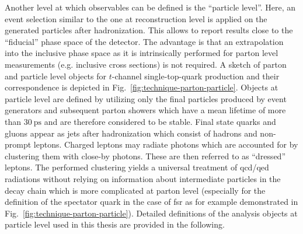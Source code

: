 
Another level at which observables can be defined is the ``particle level''. Here, an event selection similar to the one at reconstruction level is applied on the generated particles after hadronization. This allows to report results close to the ``fiducial'' phase space of the detector. The advantage is that an extrapolation into the inclusive phase space as it is intrinsically performed for parton level measurements (e.g. inclusive cross sections) is not required. A sketch of parton and particle level objects for $t$-channel single-top-quark production and their correspondence is depicted in Fig.~\ref{fig:technique-parton-particle}. Objects at particle level are defined by utilizing only the final particles produced by event generators and subsequent parton showers which have a mean lifetime of more than $30~\mathrm{ps}$ and are therefore considered to be stable. Final state quarks and gluons appear as jets after hadronization which consist of hadrons and non-prompt leptons. Charged leptons may radiate photons which are accounted for by clustering them with close-by photons. These are then referred to as ``dressed'' leptons. The performed clustering yields a universal treatment of \gls{qcd}/\gls{qed} radiations without relying on information about intermediate particles in the decay chain which is more complicated at parton level (especially for the definition of the spectator quark in the case of \gls{fsr} as for example demonstrated in Fig.~\ref{fig:technique-parton-particle}). Detailed definitions of the analysis objects at particle level used in this thesis are provided in the following.

